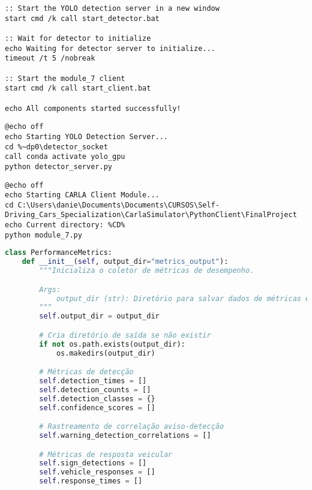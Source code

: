 \documentclass[
	12pt,				%
	oneside, %
	a4paper,			%
	english,			%
	french,				%
	spanish,			%
	brazil				%
	]{abntex2}
\begin{document}
\begin{apendicesenv}
\begin{lstlisting}[style=cmdstyle, caption={\textit{Script} de inicialização completa do sistema.}, label={lst:start_all}]
:: Start the YOLO detection server in a new window
start cmd /k call start_detector.bat

:: Wait for detector to initialize
echo Waiting for detector server to initialize...
timeout /t 5 /nobreak

:: Start the module_7 client
start cmd /k call start_client.bat

echo All components started successfully!
\end{lstlisting}

\begin{lstlisting}[style=cmdstyle, caption={Inicialização do servidor de detecção YOLOv8.}, label={lst:start_detector}]
@echo off
echo Starting YOLO Detection Server...
cd %~dp0\detector_socket
call conda activate yolo_gpu
python detector_server.py
\end{lstlisting}

\begin{lstlisting}[style=cmdstyle, caption={Inicialização do cliente CARLA e sistema de controle.}, label={lst:start_client}]
@echo off
echo Starting CARLA Client Module...
cd C:\Users\danie\Documents\Documents\CURSOS\Self-Driving_Cars_Specialization\CarlaSimulator\PythonClient\FinalProject
echo Current directory: %CD%
python module_7.py
\end{lstlisting}

\begin{lstlisting}[language=Python, caption=Inicialização do sistema de métricas de desempenho., label=lst:metrics_init]
class PerformanceMetrics:
    def __init__(self, output_dir="metrics_output"):
        """Inicializa o coletor de métricas de desempenho.

        Args:
            output_dir (str): Diretório para salvar dados de métricas e visualizações
        """
        self.output_dir = output_dir

        # Cria diretório de saída se não existir
        if not os.path.exists(output_dir):
            os.makedirs(output_dir)

        # Métricas de detecção
        self.detection_times = []
        self.detection_counts = []
        self.detection_classes = {}
        self.confidence_scores = []

        # Rastreamento de correlação aviso-detecção
        self.warning_detection_correlations = []

        # Métricas de resposta veicular
        self.sign_detections = []
        self.vehicle_responses = []
        self.response_times = []


\end{lstlisting}
\end{apendicesenv}
\end{document}
